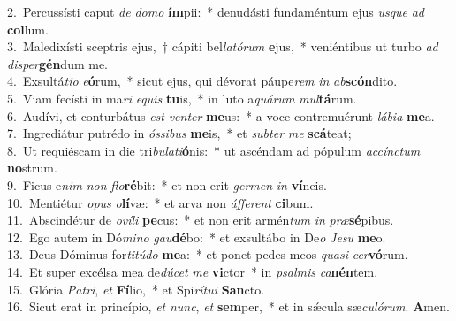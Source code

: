 {2.~}Percussísti caput \textit{de} \textit{do}\textit{mo} \textbf{ím}pii:~* denudásti fundaméntum ejus \textit{us}\textit{que} \textit{ad} \textbf{col}lum.\\
{3.~}Maledixísti sceptris ejus,~† cápiti bel\textit{la}\textit{tó}\textit{rum} \textbf{e}jus,~* veniéntibus ut turbo \textit{ad} \textit{di}\textit{sper}\textbf{gén}dum me.\\
{4.~}Exsultá\textit{ti}\textit{o} \textit{e}\textbf{ó}rum,~* sicut ejus, qui dévorat páupe\textit{rem} \textit{in} \textit{ab}\textbf{scón}dito.\\
{5.~}Viam fecísti in ma\textit{ri} \textit{e}\textit{quis} \textbf{tu}is,~* in luto a\textit{quá}\textit{rum} \textit{mul}\textbf{tá}rum.\\
{6.~}Audívi, et conturbátus \textit{est} \textit{ven}\textit{ter} \textbf{me}us:~* a voce contremuérunt \textit{lá}\textit{bi}\textit{a} \textbf{me}a.\\
{7.~}Ingrediátur putrédo in \textit{ós}\textit{si}\textit{bus} \textbf{me}is,~* et \textit{sub}\textit{ter} \textit{me} \textbf{scá}teat;\\
{8.~}Ut requiéscam in die tri\textit{bu}\textit{la}\textit{ti}\textbf{ó}nis:~* ut ascéndam ad pópulum \textit{ac}\textit{cín}\textit{ctum} \textbf{no}strum.\\
{9.~}Ficus e\textit{nim} \textit{non} \textit{flo}\textbf{ré}bit:~* et non erit \textit{ger}\textit{men} \textit{in} \textbf{ví}neis.\\
{10.~}Mentiétur \textit{o}\textit{pus} \textit{o}\textbf{lí}væ:~* et arva non \textit{áf}\textit{fe}\textit{rent} \textbf{ci}bum.\\
{11.~}Abscindétur de \textit{o}\textit{ví}\textit{li} \textbf{pe}cus:~* et non erit armén\textit{tum} \textit{in} \textit{præ}\textbf{sé}pibus.\\
{12.~}Ego autem in Dó\textit{mi}\textit{no} \textit{gau}\textbf{dé}bo:~* et exsultábo in De\textit{o} \textit{Je}\textit{su} \textbf{me}o.\\
{13.~}Deus Dóminus for\textit{ti}\textit{tú}\textit{do} \textbf{me}a:~* et ponet pedes meos \textit{qua}\textit{si} \textit{cer}\textbf{vó}rum.\\
{14.~}Et super excélsa mea de\textit{dú}\textit{cet} \textit{me} \textbf{vi}ctor~* in \textit{psal}\textit{mis} \textit{ca}\textbf{nén}tem.\\
{15.~}Glória \textit{Pa}\textit{tri}, \textit{et} \textbf{Fí}lio,~* et Spi\textit{rí}\textit{tu}\textit{i} \textbf{San}cto.\\
{16.~}Sicut erat in princípio, \textit{et} \textit{nunc}, \textit{et} \textbf{sem}per,~* et in sǽcula sæ\textit{cu}\textit{ló}\textit{rum}. \textbf{A}men.\\
